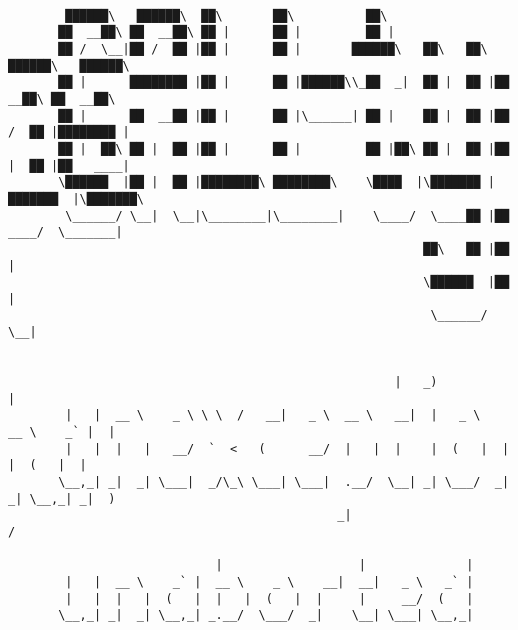 \documentclass[varwidth=\maxdimen,margin=0.5cm,multi={verbatim}]{standalone}
\begin{document}
\begin{verbatim}

        ██████\   ██████\  ██\       ██\          ██\
       ██  __██\ ██  __██\ ██ |      ██ |         ██ |
       ██ /  \__|██ /  ██ |██ |      ██ |       ██████\   ██\   ██\  ██████\   ██████\
       ██ |      ████████ |██ |      ██ |██████\\_██  _|  ██ |  ██ |██  __██\ ██  __██\
       ██ |      ██  __██ |██ |      ██ |\______| ██ |    ██ |  ██ |██ /  ██ |████████ |
       ██ |  ██\ ██ |  ██ |██ |      ██ |         ██ |██\ ██ |  ██ |██ |  ██ |██   ____|
       \██████  |██ |  ██ |████████\ ████████\    \████  |\███████ |███████  |\███████\
        \______/ \__|  \__|\________|\________|    \____/  \____██ |██  ____/  \_______|
                                                          ██\   ██ |██ |
                                                          \██████  |██ |
                                                           \______/ \__|


                                                      |   _)                       |
        |   |  __ \    _ \ \ \  /   __|   _ \  __ \   __|  |   _ \   __ \    _` |  |
        |   |  |   |   __/  `  <   (      __/  |   |  |    |  (   |  |   |  (   |  |
       \__,_| _|  _| \___|  _/\_\ \___| \___|  .__/  \__| _| \___/  _|  _| \__,_| _|  )
                                              _|                                     /

                             |                   |              |
        |   |  __ \    _` |  __ \    _ \    __|  __|   _ \   _` |
        |   |  |   |  (   |  |   |  (   |  |     |     __/  (   |
       \__,_| _|  _| \__,_| _.__/  \___/  _|    \__| \___| \__,_|



\end{verbatim}
\end{document}
